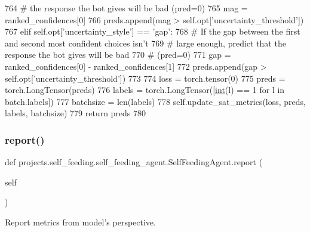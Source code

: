 \begin{DoxyCode}
764                 \textcolor{comment}{# the response the bot gives will be bad (pred=0)}
765                 mag = ranked\_confidences[0]
766                 preds.append(mag > self.opt[\textcolor{stringliteral}{'uncertainty\_threshold'}])
767             \textcolor{keywordflow}{elif} self.opt[\textcolor{stringliteral}{'uncertainty\_style'}] == \textcolor{stringliteral}{'gap'}:
768                 \textcolor{comment}{# If the gap between the first and second most confident choices isn't}
769                 \textcolor{comment}{# large enough, predict that the response the bot gives will be bad}
770                 \textcolor{comment}{# (pred=0)}
771                 gap = ranked\_confidences[0] - ranked\_confidences[1]
772                 preds.append(gap > self.opt[\textcolor{stringliteral}{'uncertainty\_threshold'}])
773 
774         loss = torch.tensor(0)
775         preds = torch.LongTensor(preds)
776         labels = torch.LongTensor([\hyperlink{namespacelanguage__model_1_1eval__ppl_a7d12ee00479673c5c8d1f6d01faa272a}{int}(l) == 1 \textcolor{keywordflow}{for} l \textcolor{keywordflow}{in} batch.labels])
777         batchsize = len(labels)
778         self.update\_sat\_metrics(loss, preds, labels, batchsize)
779         \textcolor{keywordflow}{return} preds
780 
\end{DoxyCode}
\mbox{\label{classprojects_1_1self__feeding_1_1self__feeding__agent_1_1SelfFeedingAgent_a456725f7e04d7452bd14f733fb3cea35}} 
\subsubsection{\texorpdfstring{report()}{report()}}
{\footnotesize\ttfamily def projects.\+self\+\_\+feeding.\+self\+\_\+feeding\+\_\+agent.\+Self\+Feeding\+Agent.\+report (\begin{DoxyParamCaption}\item[{}]{self }\end{DoxyParamCaption})}

\begin{DoxyVerb}Report metrics from model's perspective.
\end{DoxyVerb}
 

